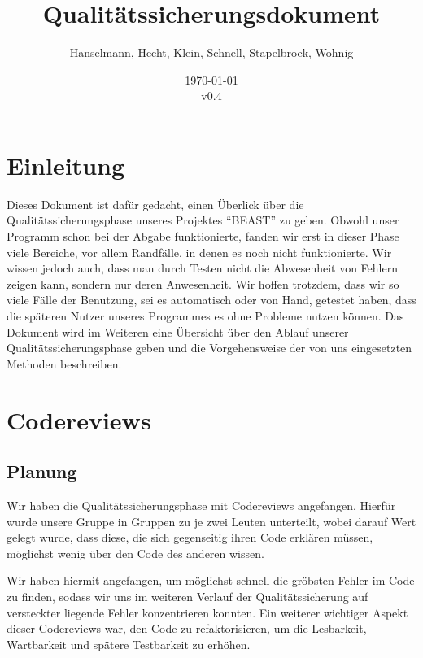 \documentclass[a4paper]{scrreprt}
\begin{document}
\title{Qualitätssicherungsdokument}
\author{Hanselmann, Hecht, Klein, Schnell, Stapelbroek, Wohnig}
\date{\today\\v0.4}
\maketitle 
\tableofcontents	

\chapter{Einleitung}
Dieses Dokument ist dafür gedacht, einen Überlick über die
Qualitätssicherungsphase unseres Projektes "`BEAST"' zu geben. Obwohl unser
Programm schon bei der Abgabe funktionierte, fanden wir erst in dieser Phase
viele Bereiche, vor allem Randfälle, in denen es noch nicht funktionierte. Wir
wissen jedoch auch, dass man durch Testen nicht die Abwesenheit von Fehlern
zeigen kann, sondern nur deren Anwesenheit. Wir hoffen trotzdem, dass wir so
viele Fälle der Benutzung, sei es automatisch oder von Hand, getestet haben,
dass die späteren Nutzer unseres Programmes es ohne Probleme nutzen können.
\newline
Das Dokument wird im Weiteren eine Übersicht über den Ablauf unserer
Qualitätssicherungsphase geben und die Vorgehensweise der von uns eingesetzten
Methoden beschreiben.

\chapter{Codereviews}

\section{Planung}
Wir haben die Qualitätssicherungsphase mit Codereviews angefangen.
Hierfür wurde unsere Gruppe in Gruppen zu je zwei Leuten unterteilt, wobei
darauf Wert gelegt wurde, dass diese, die sich gegenseitig ihren Code erklären
müssen, möglichst wenig über den Code des anderen wissen. 

Wir haben hiermit
angefangen, um möglichst schnell die gröbsten Fehler im Code zu finden, sodass
wir uns im weiteren Verlauf der Qualitätssicherung auf versteckter liegende Fehler konzentrieren
konnten. Ein weiterer wichtiger Aspekt dieser Codereviews war, den Code zu
refaktorisieren, um die Lesbarkeit, Wartbarkeit und spätere Testbarkeit zu erhöhen.
\end{document}
